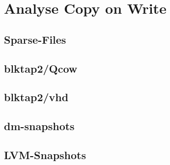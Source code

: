 \chapter{Analyse Copy on Write}
\section{Sparse-Files}
\section{blktap2/Qcow}
\section{blktap2/vhd}
\section{dm-snapshots}
\section{LVM-Snapshots} 
